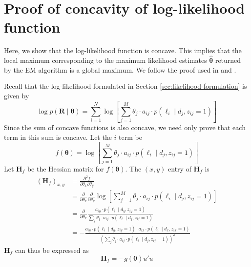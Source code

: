 \chapter{Proof of concavity of log-likelihood function}\label{sec:proof-log-lik}

Here, we show that the log-likelihood function is concave. This implies that the local maximum corresponding to the maximum likelihood estimates $\hat{\bm\theta}$ returned by the EM algorithm is a global maximum. We follow the proof used in \cite{Jiang2009} and \cite{Libo2009}.  

Recall that the log-likelihood formulated in Section \ref{sec:likelihood-formulation} is given by
\begin{equation}
    \log p(\bm{R}\mid\bm{\theta}) = \sum_{i=1}^N \log \left[\sum_{j=1}^M \theta_j\cdot a_{ij}\cdot p(\ell_i\mid d_j, z_{ij}=1)\right]
\end{equation}
Since the sum of concave functions is also concave, we need only prove that each term in this sum is concave. Let the $i$ term be
\begin{equation}
    f(\bm\theta) = \log \left[\sum_{j=1}^M \theta_j\cdot a_{ij}\cdot p(\ell_i\mid d_j, z_{ij}=1)\right]
\end{equation}
Let $\mathrm{\mathbf{H}}_f$ be the Hessian matrix for $f(\bm\theta)$. The $(x,y)$ entry of $\mathrm{\mathbf{H}}_f$ is 
\begin{equation}
    \begin{split}
        \left(\mathbf{H}_{f}\right)_{x, y} & =\frac{\partial^{2} f}{\partial \theta_{x} \partial \theta_{y}} \\
        & =\frac{\partial}{\partial \theta_{x}} \frac{\partial}{\partial \theta_{y}} \log \left[\sum_{j=1}^{M} \theta_{j} \cdot a_{i j} \cdot p\left(\ell_{i} \mid d_{j}, z_{i j}=1\right)\right] \\
        & =\frac{\partial}{\partial \theta_{x}} \frac{a_{i y} \cdot p\left(\ell_{i} \mid d_{y}, z_{i y}=1\right)}{\sum_{j} \theta_{j} \cdot a_{i j} \cdot p\left(\ell_{i} \mid d_{j}, z_{i j}=1\right)} \\
        & =-\frac{a_{i y} \cdot p\left(\ell_{i} \mid d_{y}, z_{i y}=1\right) \cdot a_{i x} \cdot p\left(\ell_{i} \mid d_{x}, z_{i x}=1\right)}{\left(\sum_{j} \theta_{j} \cdot a_{i j} \cdot p\left(\ell_{i} \mid d_{j}, z_{i j}=1\right)\right)^{2}}
    \end{split}
\end{equation}
$\mathrm{\mathbf{H}}_f$ can thus be expressed as 
\begin{equation}
    \mathrm{\mathbf{H}}_f = -g(\bm\theta)u'u
\end{equation}
